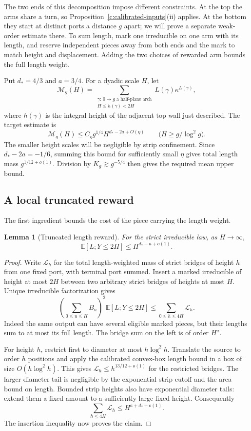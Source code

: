 \documentclass[11pt]{article}
\numberwithin{equation}{section}
\newtheorem{lemma}[theorem]{Lemma}
\theoremstyle{definition}\newtheorem{definition}[theorem]{Definition}
\theoremstyle{remark}\newtheorem{remark}[theorem]{Remark}
\begin{document}
The two ends of this decomposition impose different constraints. At the
top the arms share a turn, so Proposition~\ref{c:calibrated-inputs}(ii)
applies. At the bottom they start at distinct ports a distance $g$ apart;
we will prove a separate weak-order estimate there. To sum length, mark
one irreducible on one arm with its length, and reserve independent
pieces away from both ends and the mark to match height and displacement.
Adding the two choices of rewarded arm bounds the full length weight.

Put $d_*=4/3$ and $a=3/4$. For a dyadic scale $H$, let
\[
 \mathcal M_g(H)=
 \sum_{\substack{\gamma:\,0\to g\text{ a half-plane arch}\\
                  H\le h(\gamma)<2H}}
       L(\gamma)\kappa^{L(\gamma)},
\]
where $h(\gamma)$ is the integral height of the adjacent top wall just
described. The target estimate is
\begin{equation}\label{c:arch-dyadic-target}
 \mathcal M_g(H)\le C_\eta g^{1/4}H^{d_*-2a+O(\eta)}
 \qquad\bigl(H\ge g/\log^2g\bigr).
\end{equation}
The smaller height scales will be negligible by strip confinement.
Since $d_*-2a=-1/6$, summing this bound for sufficiently small $\eta$
gives total length mass $g^{1/12+o(1)}$. Division by
$K_g\gtrsim g^{-5/4}$ then gives the required mean upper bound.

\subsection{A local truncated reward}
The first ingredient bounds the cost of the piece carrying the length
weight.
\begin{lemma}[Truncated length reward]\label{c:truncated-reward}
For the strict irreducible law, as $H\to\infty$,
\[
 \mathbb E[L; Y\le 2H]\le H^{d_*-a+o(1)} .
\]
\end{lemma}
\begin{proof}
Write $\mathcal L_h$ for the total length-weighted mass of strict bridges
of height $h$ from one fixed port, with terminal port summed. Insert a
marked irreducible of height at most $2H$ between two arbitrary strict
bridges of heights at most $H$. Unique irreducible factorization gives
\[
 \left(\sum_{0\le u\le H}B_u\right)^2
       \mathbb E[L;Y\le2H]
 \le \sum_{0\le h\le4H}\mathcal L_h.
\]
Indeed the same output can have several eligible marked pieces, but
their lengths sum to at most its full length. The bridge sum on the left
is of order $H^a$.

For height $h$, restrict first to diameter at most $h\log^2h$. Translate
the source to order $h$ positions and apply the calibrated convex-box
length bound in a box of size $O(h\log^2h)$. This gives
$\mathcal L_h\le h^{13/12+o(1)}$ for the restricted bridges. The larger
diameter tail is negligible by the exponential strip cutoff and the
area bound on length. Bounded strip heights also have exponential
diameter tails: extend them a fixed amount to a sufficiently large
fixed height. Consequently
\[
 \sum_{h\le4H}\mathcal L_h\le H^{a+d_*+o(1)}.
\]
The insertion inequality now proves the claim.
\end{proof}
\end{document}
